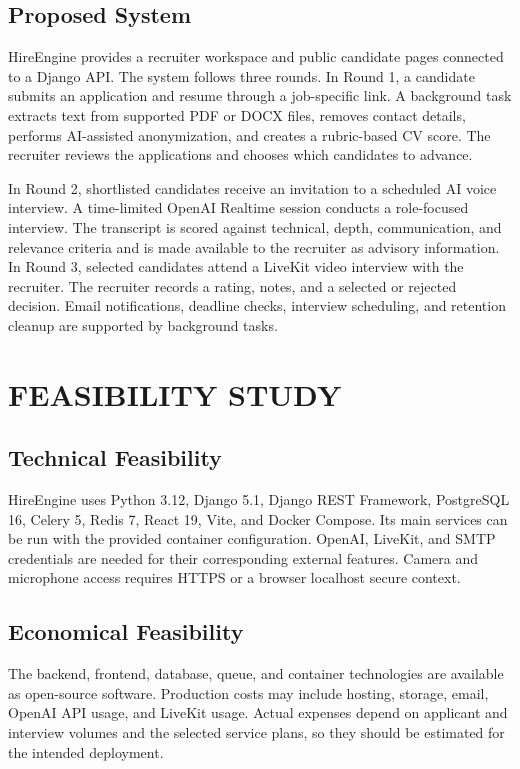\section{Proposed System}
HireEngine provides a recruiter workspace and public candidate pages connected to a Django API. The system follows three rounds. In Round 1, a candidate submits an application and resume through a job-specific link. A background task extracts text from supported PDF or DOCX files, removes contact details, performs AI-assisted anonymization, and creates a rubric-based CV score. The recruiter reviews the applications and chooses which candidates to advance.

In Round 2, shortlisted candidates receive an invitation to a scheduled AI voice interview. A time-limited OpenAI Realtime session conducts a role-focused interview. The transcript is scored against technical, depth, communication, and relevance criteria and is made available to the recruiter as advisory information. In Round 3, selected candidates attend a LiveKit video interview with the recruiter. The recruiter records a rating, notes, and a selected or rejected decision. Email notifications, deadline checks, interview scheduling, and retention cleanup are supported by background tasks.
%
%
%
%
\chapter{FEASIBILITY STUDY}
%
\section{Technical Feasibility}
HireEngine uses Python 3.12, Django 5.1, Django REST Framework, PostgreSQL 16, Celery 5, Redis 7, React 19, Vite, and Docker Compose. Its main services can be run with the provided container configuration. OpenAI, LiveKit, and SMTP credentials are needed for their corresponding external features. Camera and microphone access requires HTTPS or a browser localhost secure context.
%
\section{Economical Feasibility}
The backend, frontend, database, queue, and container technologies are available as open-source software. Production costs may include hosting, storage, email, OpenAI API usage, and LiveKit usage. Actual expenses depend on applicant and interview volumes and the selected service plans, so they should be estimated for the intended deployment.
%
